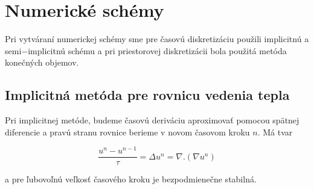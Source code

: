 \documentclass[a4paper,11pt,twoside]{article}%
\begin{document}
\newpage
\section{Numerické schémy}

Pri vytváraní numerickej schémy sme pre časovú diskretizáciu použili implicitnú a semi$-$implicitnú schému a pri priestorovej diskretizácii bola použitá metóda konečných objemov.



\subsection{Implicitná metóda pre rovnicu vedenia tepla}

Pri implicitnej metóde, budeme časovú deriváciu aproximovať pomocou spätnej diferencie a pravú stranu rovnice berieme v novom časovom kroku $n$. Má tvar

\begin{equation} \label{eq:ihe}
\frac{u^n - u^{n-1}}{\tau} = \Delta u^n = \nabla . (\nabla u^n)
\end{equation}

a pre ľubovoľnú veľkosť časového kroku je bezpodmienečne stabilná. 
\end{document}

